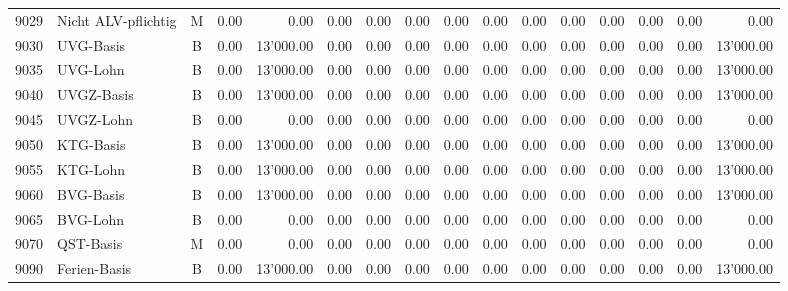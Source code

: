\documentclass[8pt,a4paper]{extarticle}
\begin{document}
\begin{longtable}{@{\extracolsep{\fill}} l l c r r r r r r r r r r r r r}
9029&Nicht ALV-pflichtig&M&0.00&0.00&0.00&0.00&0.00&0.00&0.00&0.00&0.00&0.00&0.00&0.00&0.00\\
9030&UVG-Basis&B&0.00&13'000.00&0.00&0.00&0.00&0.00&0.00&0.00&0.00&0.00&0.00&0.00&13'000.00\\
9035&UVG-Lohn&B&0.00&13'000.00&0.00&0.00&0.00&0.00&0.00&0.00&0.00&0.00&0.00&0.00&13'000.00\\
9040&UVGZ-Basis&B&0.00&13'000.00&0.00&0.00&0.00&0.00&0.00&0.00&0.00&0.00&0.00&0.00&13'000.00\\
9045&UVGZ-Lohn&B&0.00&0.00&0.00&0.00&0.00&0.00&0.00&0.00&0.00&0.00&0.00&0.00&0.00\\
9050&KTG-Basis&B&0.00&13'000.00&0.00&0.00&0.00&0.00&0.00&0.00&0.00&0.00&0.00&0.00&13'000.00\\
9055&KTG-Lohn&B&0.00&13'000.00&0.00&0.00&0.00&0.00&0.00&0.00&0.00&0.00&0.00&0.00&13'000.00\\
9060&BVG-Basis&B&0.00&13'000.00&0.00&0.00&0.00&0.00&0.00&0.00&0.00&0.00&0.00&0.00&13'000.00\\
9065&BVG-Lohn&B&0.00&0.00&0.00&0.00&0.00&0.00&0.00&0.00&0.00&0.00&0.00&0.00&0.00\\
9070&QST-Basis&M&0.00&0.00&0.00&0.00&0.00&0.00&0.00&0.00&0.00&0.00&0.00&0.00&0.00\\
9090&Ferien-Basis&B&0.00&13'000.00&0.00&0.00&0.00&0.00&0.00&0.00&0.00&0.00&0.00&0.00&13'000.00\\

\end{longtable}
\pagebreak
\end{document}
